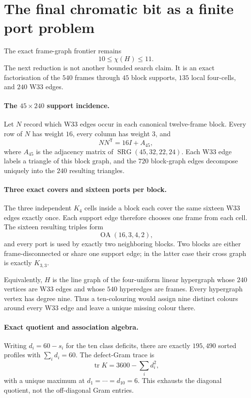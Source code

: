 \section{The final chromatic bit as a finite port problem}
\label{sec:bt3205-3213-chromatic-closure}

The exact frame-graph frontier remains
\[
\boxed{10\leq\chi(H)\leq11}.
\]
The next reduction is not another bounded search claim.  It is an exact
factorisation of the $540$ frames through $45$ block supports, $135$ local
four-cells, and $240$ W33 edges.

\paragraph{The $45\times240$ support incidence.}
Let $N$ record which W33 edges occur in each canonical twelve-frame block.
Every row of $N$ has weight $16$, every column has weight $3$, and
\[
\boxed{NN^{\mathsf T}=16I+A_{45}},
\]
where $A_{45}$ is the adjacency matrix of
$\operatorname{SRG}(45,32,22,24)$.  Each W33 edge labels a triangle of this
block graph, and the $720$ block-graph edges decompose uniquely into the
$240$ resulting triangles.

\paragraph{Three exact covers and sixteen ports per block.}
The three independent $K_4$ cells inside a block each cover the same sixteen
W33 edges exactly once.  Each support edge therefore chooses one frame from
each cell.  The sixteen resulting triples form
\[
\boxed{\operatorname{OA}(16,3,4,2)},
\]
and every port is used by exactly two neighboring blocks.  Two blocks are
either frame-disconnected or share one support edge; in the latter case their
cross graph is exactly $K_{3,3}$.

Equivalently, $H$ is the line graph of the four-uniform linear hypergraph whose
$240$ vertices are W33 edges and whose $540$ hyperedges are frames.  Every
hypergraph vertex has degree nine.  Thus a ten-colouring would assign nine
distinct colours around every W33 edge and leave a unique missing colour there.

\paragraph{Exact quotient and association algebra.}
Writing $d_i=60-s_i$ for the ten class deficits, there are exactly
$195{,}490$ sorted profiles with $\sum_i d_i=60$.  The defect-Gram trace is
\[
\operatorname{tr}K=3600-\sum_i d_i^2,
\]
with a unique maximum at $d_1=\cdots=d_{10}=6$.  This exhausts the diagonal
quotient, not the off-diagonal Gram entries.

